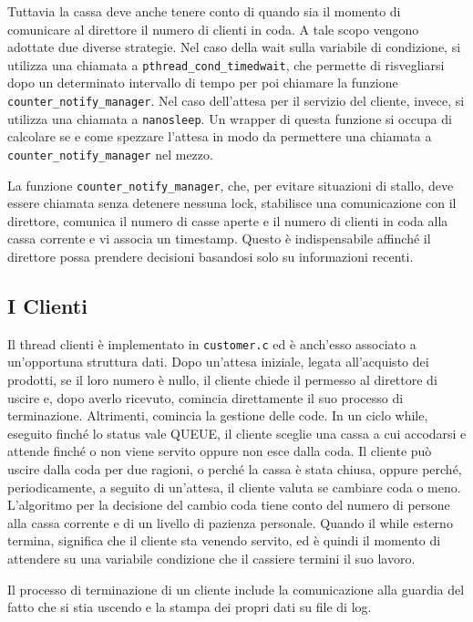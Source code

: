 \documentclass[a4paper,11pt] {article}
\begin{document}
Tuttavia la cassa deve anche tenere conto di quando sia il momento di comunicare al direttore il numero di clienti in coda. A tale scopo vengono adottate due diverse strategie. Nel caso della wait sulla variabile di condizione, si utilizza una chiamata a \lstinline{pthread_cond_timedwait}, che permette di risvegliarsi dopo un determinato intervallo di tempo per poi chiamare la funzione \lstinline{counter_notify_manager}. Nel caso dell'attesa per il servizio del cliente, invece, si utilizza una chiamata a \lstinline{nanosleep}. Un wrapper di questa funzione si occupa di calcolare se e come spezzare l'attesa in modo da permettere una chiamata a \lstinline{counter_notify_manager} nel mezzo.

La funzione \lstinline{counter_notify_manager}, che, per evitare situazioni di stallo, deve essere chiamata senza detenere nessuna lock, stabilisce una comunicazione con il direttore, comunica il numero di casse aperte e il numero di clienti in coda alla cassa corrente e vi associa un timestamp. Questo è indispensabile affinché il direttore possa prendere decisioni basandosi solo su informazioni recenti.

\subsection*{I Clienti}

Il thread clienti è implementato in \lstinline{customer.c} ed è anch'esso associato a un'opportuna struttura dati. Dopo un'attesa iniziale, legata all'acquisto dei prodotti, se il loro numero è nullo, il cliente chiede il permesso al direttore di uscire e, dopo averlo ricevuto, comincia direttamente il suo processo di terminazione. Altrimenti, comincia la gestione delle code. In un ciclo while, eseguito finché lo status vale QUEUE, il cliente sceglie una cassa a cui accodarsi e attende finché o non viene servito oppure non esce dalla coda. Il cliente può uscire dalla coda per due ragioni, o perché la cassa è stata chiusa, oppure perché, periodicamente, a seguito di un'attesa, il cliente valuta se cambiare coda o meno. L'algoritmo per la decisione del cambio coda tiene conto del numero di persone alla cassa corrente e di un livello di pazienza personale.
Quando il while esterno termina, significa che il cliente sta venendo servito, ed è quindi il momento di attendere su una variabile condizione che il cassiere termini il suo lavoro.

Il processo di terminazione di un cliente include la comunicazione alla guardia del fatto che si stia uscendo e la stampa dei propri dati su file di log.
\end{document}
